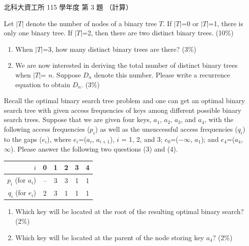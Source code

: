 \begin{pastexam}[label={px:ntut-115-ci-03}]{北科大資工所 115 學年度 第 3 題}
（計算）

Let $|T|$ denote the number of nodes of a binary tree $T$. If $|T|$=0 or $|T|$=1, there is only one
binary tree. If $|T|$=2, then there are two distinct binary trees. (10\%)
\begin{enumerate}[label=(\arabic*)]
\item When $|T|$=3, how many distinct binary trees are there? (3\%)
\item We are now interested in deriving the total number of distinct binary trees when $|T|$=
$n$. Suppose $D_n$ denote this number. Please write a recurrence equation to obtain $D_n$. (3\%)
\end{enumerate}
Recall the optimal binary search tree problem and one can get an optimal binary search tree with
given access frequencies of keys among different possible binary search trees. Suppose that we are
given four keys, $a_1$, $a_2$, $a_3$, and $a_4$, with the following access frequencies ($p_i$) as
well as the unsuccessful access frequencies ($q_i$) to the gaps ($e_i$), where
$e_i$=($a_i$, $a_{i+1}$), $i$ = 1, 2, and 3; $e_0$=($-\infty$, $a_1$); and $e_4$=($a_4$, $\infty$).
Please answer the following two questions (3) and (4).
\begin{center}
\begin{tabular}{r|c|c|c|c|c}
$i$ & 0 & 1 & 2 & 3 & 4\\\hline
$p_i$ (for $a_i$) & -- & 3 & 3 & 1 & 1\\\hline
$q_i$ (for $e_i$) & 2 & 3 & 1 & 1 & 1
\end{tabular}
\end{center}
\begin{enumerate}[label=(\arabic*),start=3]
\item Which key will be located at the root of the resulting optimal binary search? (2\%)
\item Which key will be located at the parent of the node storing key $a_4$? (2\%)
\end{enumerate}
\end{pastexam}

